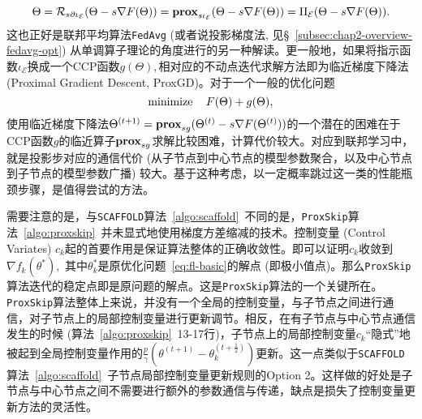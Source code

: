 \begin{equation*}
\Theta = \mathcal{R}_{s\partial\iota_{\mathcal{E}}}(\Theta - s\nabla F(\Theta)) = \mathbf{prox}_{s\iota_{\mathcal{E}}}(\Theta - s\nabla F(\Theta)) = \Pi_{\mathcal{E}}(\Theta - s\nabla F(\Theta)).
\end{equation*}
这也正好是联邦平均算法\texttt{FedAvg} (或者说投影梯度法, 见\S~\ref{subsec:chap2-overview-fedavg-opt}) 从单调算子理论的角度进行的另一种解读。更一般地，如果将指示函数$\iota_{\mathcal{E}}$换成一个CCP函数$g(\Theta),$相对应的不动点迭代求解方法即为临近梯度下降法 (Proximal Gradient Descent, ProxGD)。对于一个一般的优化问题
\begin{equation*}
\operatorname*{minimize} \quad F(\Theta) + g(\Theta),
\end{equation*}
使用临近梯度下降法$\Theta^{(t+1)} = \mathbf{prox}_{sg}(\Theta^{(t)} - s\nabla F(\Theta^{(t)}))$的一个潜在的困难在于CCP函数$g$的临近算子$\mathbf{prox}_{sg}$求解比较困难，计算代价较大\cite{friedlander2017efficient}。对应到联邦学习中，就是投影步对应的通信代价 (从子节点到中心节点的模型参数聚合，以及中心节点到子节点的模型参数广播) 较大。基于这种考虑，以一定概率跳过这一类的性能瓶颈步骤，是值得尝试的方法。

需要注意的是，与\texttt{SCAFFOLD}算法~\ref{algo:scaffold}~不同的是，\texttt{ProxSkip}算法~\ref{algo:proxskip}~并未显式地使用梯度方差缩减的技术。控制变量 (Control Variates) $c_k$起的首要作用是保证算法整体的正确收敛性。即可以证明$c_k$收敛到$\nabla f_k(\theta^*),$ 其中$\theta_k^*$是原优化问题~\ref{eq:fl-basic}的解点 (即极小值点)。那么\texttt{ProxSkip}算法迭代的稳定点即是原问题的解点。这是\texttt{ProxSkip}算法的一个关键所在。\texttt{ProxSkip}算法整体上来说，并没有一个全局的控制变量，与子节点之间进行通信，对子节点上的局部控制变量进行更新调节。相反，在有子节点与中心节点通信发生的时候 (算法~\ref{algo:proxskip}~13-17行)，子节点上的局部控制变量$c_k$``隐式''地被起到全局控制变量作用的$\frac{p}{\gamma}(\theta^{(t+1)} - \theta^{(t+\frac{1}{2})}_{k})$更新。这一点类似于\texttt{SCAFFOLD}算法~\ref{algo:scaffold}~子节点局部控制变量更新规则的Option 2。这样做的好处是子节点与中心节点之间不需要进行额外的参数通信与传递，缺点是损失了控制变量更新方法的灵活性。
